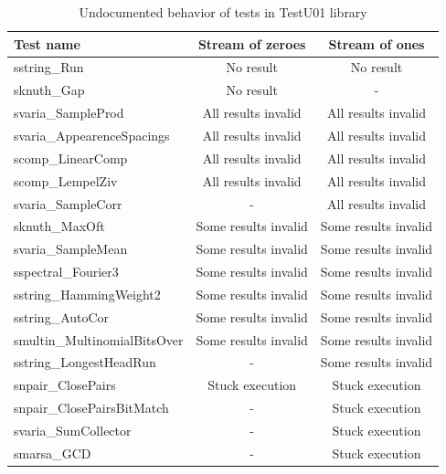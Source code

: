 \documentclass[
  digital,  	%
  color,		%
  oneside,   	%
  12pt,
  nocover,
  notable,
  nolof,
  nolot,
]{fithesis3}
\begin{document}
\begin{table}[h!]
\begin{nomar}
\centering
\begin{tabular}{l || c | c }
\textbf{Test name}                 & \textbf{Stream of zeroes} & \textbf{Stream of ones} \\ \hline \hline    
sstring\_Run                       & No result                & No result                \\
sknuth\_Gap                        & No result                & -                        \\ \hline
svaria\_SampleProd                 & All results invalid      & All results invalid      \\
svaria\_AppearenceSpacings         & All results invalid      & All results invalid      \\   
scomp\_LinearComp                  & All results invalid      & All results invalid      \\
scomp\_LempelZiv                   & All results invalid      & All results invalid      \\
svaria\_SampleCorr                 & -                        & All results invalid      \\ \hline
sknuth\_MaxOft                     & Some results invalid     & Some results invalid     \\
svaria\_SampleMean                 & Some results invalid     & Some results invalid     \\
sspectral\_Fourier3                & Some results invalid     & Some results invalid     \\
sstring\_HammingWeight2            & Some results invalid     & Some results invalid     \\
sstring\_AutoCor                   & Some results invalid     & Some results invalid     \\
smultin\_MultinomialBitsOver       & Some results invalid     & Some results invalid     \\
sstring\_LongestHeadRun            & -                        & Some results invalid     \\ \hline
snpair\_ClosePairs                 & Stuck execution          & Stuck execution          \\
snpair\_ClosePairsBitMatch         & -                        & Stuck execution          \\
svaria\_SumCollector               & -                        & Stuck execution          \\
smarsa\_GCD                        & -                        & Stuck execution          \\                                       
\end{tabular}
\end{nomar}  
\caption{Undocumented behavior of tests in TestU01 library}
\label{tab:testu01_errors}                                                                                           
\end{table}
\end{document}
